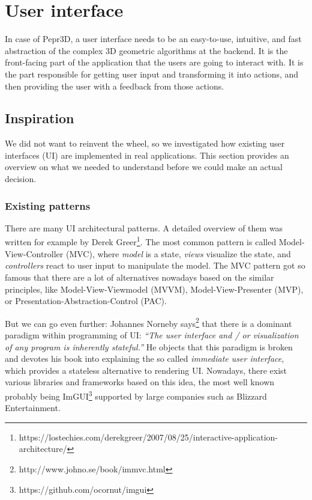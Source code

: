 \chapter{User interface}

In case of Pepr3D, a user interface needs to be an easy-to-use, intuitive, and fast abstraction of the complex 3D geometric algorithms at the backend.
It is the front-facing part of the application that the users are going to interact with.
It is the part responsible for getting user input and transforming it into actions, and then providing the user with a feedback from those actions.

\section{Inspiration}

We did not want to reinvent the wheel, so we investigated how existing user interfaces (UI) are implemented in real applications.
This section provides an overview on what we needed to understand before we could make an actual decision.

\subsection{Existing patterns}

There are many UI architectural patterns.
A detailed overview of them was written for example by Derek Greer\footnote{https://lostechies.com/derekgreer/2007/08/25/interactive-application-architecture/}.
The most common pattern is called Model-View-Controller (MVC), where \emph{model} is a state, \emph{views} visualize the state, and \emph{controllers} react to user input to manipulate the model.
The MVC pattern got so famous that there are a lot of alternatives nowadays based on the similar principles, like Model-View-Viewmodel (MVVM), Model-View-Presenter (MVP), or Presentation-Abstraction-Control (PAC).

But we can go even further: Johannes Norneby says\footnote{http://www.johno.se/book/immvc.html} that there is a dominant paradigm within programming of UI: \emph{``The user interface and / or visualization of any program is inherently stateful.''}
He objects that this paradigm is broken and devotes his book into explaining the so called \emph{immediate user interface}, which provides a stateless alternative to rendering UI.
Nowadays, there exist various libraries and frameworks based on this idea, the most well known probably being ImGUI\footnote{https://github.com/ocornut/imgui} supported by large companies such as Blizzard Entertainment.

